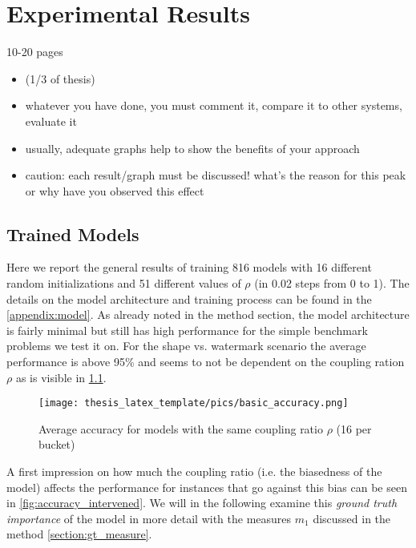 \chapter{Experimental Results}\label{chapter:results}

{ \color{red}
10-20 pages 

    \begin{itemize}
        \item (1/3 of thesis)
        \item whatever you have done, you must comment it, compare it to other systems, evaluate it
        \item usually, adequate graphs help to show the benefits of your approach
        \item caution: each result/graph must be discussed! what's the reason for this peak or why have you observed this effect
    \end{itemize}
}

\section{Trained Models}
Here we report the general results of training 816 models with 16 different random initializations and 51 different values of $\rho$ (in 0.02 steps from 0 to 1).
The details on the model architecture and training process can be found in the \cref{appendix:model}. 
As already noted in the method section, the model architecture is fairly minimal but still has high performance for the simple benchmark problems we test it on. 
For the shape vs. watermark scenario the average performance is above 95\% and seems to not be dependent on the coupling ration $\rho$ as is visible in \cref{fig:basic_accuracy}.
\begin{figure}[t!]
    \centering
    \texttt{[image: thesis\_latex\_template/pics/basic\_accuracy.png]}
    \caption[Accuracy]{Average accuracy for models with the same coupling ratio $\rho$ (16 per bucket)}
    \label{fig:basic_accuracy}
\end{figure}


A first impression on how much the coupling ratio (i.e. the biasedness of the model) affects the performance for instances that go against this bias can be seen in \cref{fig:accuracy_intervened}. We will in the following examine this \textit{ground truth importance} of the model in more detail with the measures $m_1$ discussed in the method \cref{section:gt_measure}.


